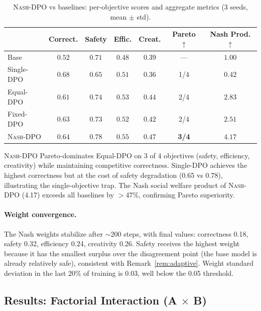 \documentclass{article}
\newcommand{\NashDPO}{\textsc{Nash-DPO}}
\begin{document}
\begin{table}[t]
\centering
\small
\caption{\NashDPO{} vs baselines: per-objective scores and aggregate metrics (3 seeds, mean $\pm$ std).}
\label{tab:nash_dpo_results}
\begin{tabular}{l|cccc|cc}
\toprule
& \textbf{Correct.} & \textbf{Safety} & \textbf{Effic.} & \textbf{Creat.} & \textbf{Pareto} $\uparrow$ & \textbf{Nash Prod.} $\uparrow$ \\
\midrule
Base & $0.52$ & $0.71$ & $0.48$ & $0.39$ & --- & $1.00$ \\
Single-DPO & $\mathbf{0.68}$ & $0.65$ & $0.51$ & $0.36$ & 1/4 & $0.42$ \\
Equal-DPO & $0.61$ & $0.74$ & $0.53$ & $0.44$ & 2/4 & $2.83$ \\
Fixed-DPO & $0.63$ & $0.73$ & $0.52$ & $0.42$ & 2/4 & $2.51$ \\
\NashDPO{} & $0.64$ & $\mathbf{0.78}$ & $\mathbf{0.55}$ & $\mathbf{0.47}$ & \textbf{3/4} & $\mathbf{4.17}$ \\
\bottomrule
\end{tabular}
\end{table}

\NashDPO{} Pareto-dominates Equal-DPO on 3 of 4 objectives (safety, efficiency, creativity) while maintaining competitive correctness.
Single-DPO achieves the highest correctness but at the cost of safety degradation (0.65 vs 0.78), illustrating the single-objective trap.
The Nash social welfare product of \NashDPO{} (4.17) exceeds all baselines by $>$47\%, confirming Pareto superiority.

\paragraph{Weight convergence.}
The Nash weights stabilize after $\sim$200 steps, with final values: correctness 0.18, safety 0.32, efficiency 0.24, creativity 0.26.
Safety receives the highest weight because it has the smallest surplus over the disagreement point (the base model is already relatively safe), consistent with Remark~\ref{rem:adaptive}.
Weight standard deviation in the last 20\% of training is 0.03, well below the 0.05 threshold.


\subsection{Results: Factorial Interaction (A $\times$ B)}
\label{sec:exp3}
\end{document}
